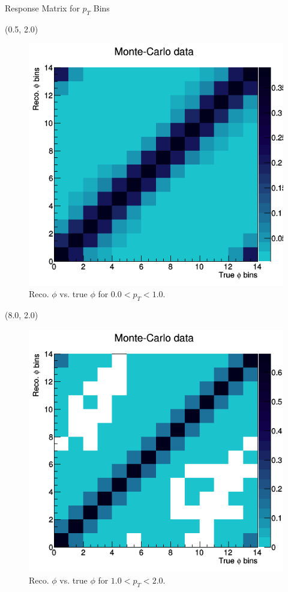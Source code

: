 \documentclass[10pt, xcolor={dvipsnames}, aspectratio = 169]{beamer}
\begin{document}
%
%
%
\begin{frame}{Response Matrix for $p_{T}$ Bins}

\begin{textblock}{7.0}(0.5, 2.0)
\begin{figure}
    \centering
    \includegraphics[width = 1.0\linewidth]{imgs/matrix_pt0.png}
    \caption{Reco. $\phi$ vs. true $\phi$ for $0.0 < p_{T} < 1.0$.}
\end{figure}
\end{textblock}

\begin{textblock}{7.0}(8.0, 2.0)
\begin{figure}
    \centering
    \includegraphics[width = 1.0\linewidth]{imgs/matrix_pt1.png}
    \caption{Reco. $\phi$ vs. true $\phi$ for $1.0 < p_{T} < 2.0$.}
\end{figure}
\end{textblock}

\end{frame}
\end{document}
